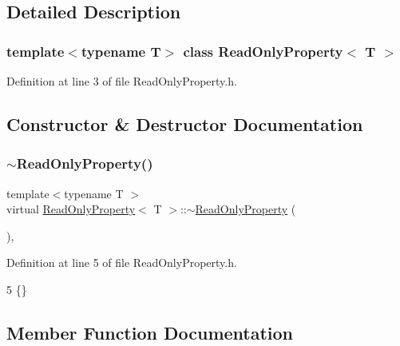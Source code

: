 \subsection{Detailed Description}
\subsubsection*{template$<$typename T$>$\newline
class Read\+Only\+Property$<$ T $>$}



Definition at line 3 of file Read\+Only\+Property.\+h.



\subsection{Constructor \& Destructor Documentation}
\mbox{\label{classReadOnlyProperty_aa34b40fc62c654174c672fabf07ddf10}} 
\subsubsection{\texorpdfstring{$\sim$\+Read\+Only\+Property()}{~ReadOnlyProperty()}}
{\footnotesize\ttfamily template$<$typename T $>$ \\
virtual \mbox{\hyperlink{classReadOnlyProperty}{Read\+Only\+Property}}$<$ T $>$\+::$\sim$\mbox{\hyperlink{classReadOnlyProperty}{Read\+Only\+Property}} (\begin{DoxyParamCaption}{ }\end{DoxyParamCaption})\hspace{0.3cm}{\ttfamily [inline]}, {\ttfamily [virtual]}}



Definition at line 5 of file Read\+Only\+Property.\+h.


\begin{DoxyCode}
5 \{\}
\end{DoxyCode}


\subsection{Member Function Documentation}
\mbox{\label{classReadOnlyProperty_a9e46deac4a2cea32d6914ff518fe0fed}} 
